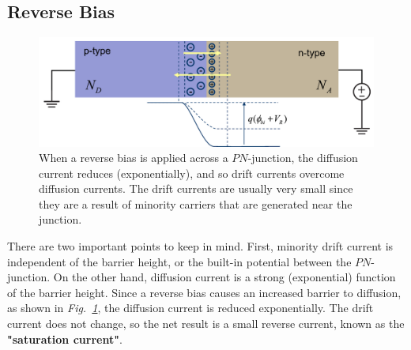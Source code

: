 \subsection{Reverse Bias}
\begin{figure}[b]
\centering
\includegraphics[width=.95\columnwidth]{slide36}
\caption{When a reverse bias is applied across a $PN$-junction, the diffusion current reduces (exponentially), and so drift currents overcome diffusion currents.  The drift currents are usually very small since they are a result of minority carriers that are generated near the junction.}
\label{fig:slide36}
\end{figure}
There are two important points to keep in mind.  First, minority drift current is independent of the barrier height, or the built-in potential between the $PN$-junction.  On the other hand, diffusion current is a strong (exponential) function of the barrier height.  Since a reverse bias causes an increased barrier to diffusion, as shown in \emph{Fig.~\ref{fig:slide36}}, the diffusion current is reduced exponentially.  The drift current does not change, so the net result is a small reverse current, known as the \textbf{"saturation current"}.
\newpage
